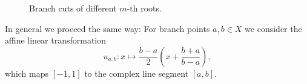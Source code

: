 \documentclass[main.tex]{subfiles}
\begin{document}
  \begin{figure}[H]
      \begin{center}
      \end{center}
      \caption{Branch cuts of different $m$-th roots.}
  \label{fig:mth_root_pol} \end{figure}

  In general we proceed the same way: For branch points $a,b \in X$ we consider the affine linear
  transformation
  \begin{equation}
      \label{def:uab}
      u_{a,b} : x \mapsto \frac{b-a}{2}\left(x+\frac{b+a}{b-a}\right),
  \end{equation}
  which maps $[-1,1]$ to the complex line segment $[a,b]$.
  
\end{document}
